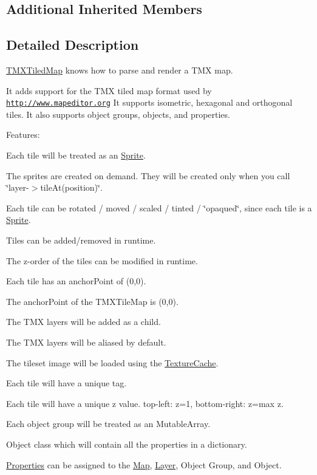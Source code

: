 \subsection*{Additional Inherited Members}


\subsection{Detailed Description}
\hyperlink{classTMXTiledMap}{T\+M\+X\+Tiled\+Map} knows how to parse and render a T\+MX map. 

It adds support for the T\+MX tiled map format used by \href{http://www.mapeditor.org}{\tt http\+://www.\+mapeditor.\+org} It supports isometric, hexagonal and orthogonal tiles. It also supports object groups, objects, and properties.

Features\+:
\begin{DoxyItemize}
\item Each tile will be treated as an \hyperlink{classSprite}{Sprite}.
\item The sprites are created on demand. They will be created only when you call \char`\"{}layer-\/$>$tile\+At(position)\char`\"{}.
\item Each tile can be rotated / moved / scaled / tinted / \char`\"{}opaqued\char`\"{}, since each tile is a \hyperlink{classSprite}{Sprite}.
\item Tiles can be added/removed in runtime.
\item The z-\/order of the tiles can be modified in runtime.
\item Each tile has an anchor\+Point of (0,0).
\item The anchor\+Point of the T\+M\+X\+Tile\+Map is (0,0).
\item The T\+MX layers will be added as a child.
\item The T\+MX layers will be aliased by default.
\item The tileset image will be loaded using the \hyperlink{classTextureCache}{Texture\+Cache}.
\item Each tile will have a unique tag.
\item Each tile will have a unique z value. top-\/left\+: z=1, bottom-\/right\+: z=max z.
\item Each object group will be treated as an Mutable\+Array.
\item Object class which will contain all the properties in a dictionary.
\item \hyperlink{classProperties}{Properties} can be assigned to the \hyperlink{classMap}{Map}, \hyperlink{classLayer}{Layer}, Object Group, and Object.
\end{DoxyItemize}

